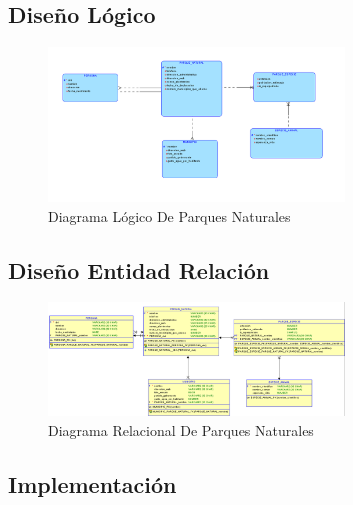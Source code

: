 \documentclass{article}
\begin{document}
\subsection{Diseño Lógico}

\begin{figure}
	\centering
	\includegraphics[width=0.70\textwidth]{images/diagrama_logico_parques_naturales.png}
	\caption{Diagrama Lógico De Parques Naturales}
	\label{fig:p_logico}
\end{figure}


\subsection{Diseño Entidad Relación}

\begin{figure}
	\centering
	\includegraphics[width=0.70\textwidth]{images/diagrama_relacional_parques_naturales.png}
	\caption{Diagrama Relacional De Parques Naturales}
	\label{fig:p_relacional}
\end{figure}

\subsection{Implementación}
\end{document}
